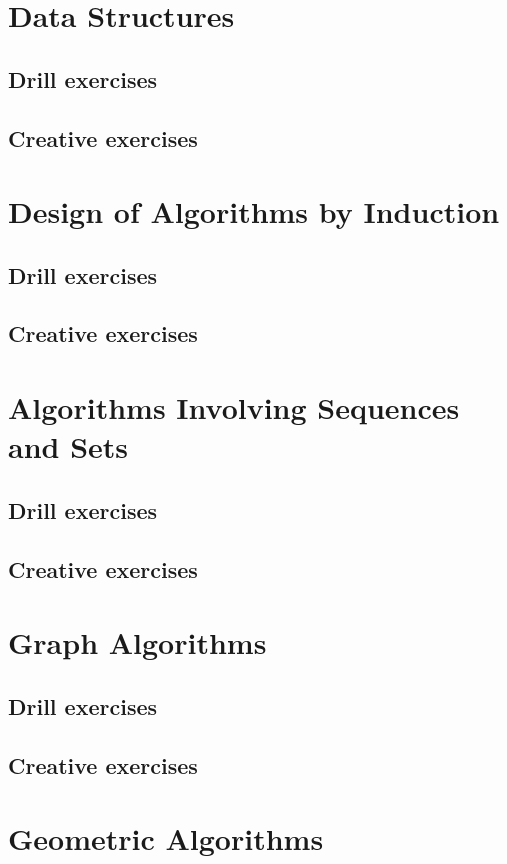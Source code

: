\documentclass[a4paper,11pt]{memoir}
\begin{document}
    \chapter{Data Structures}
    \section{Drill exercises}
    \section{Creative exercises}
    
    \chapter{Design of Algorithms by Induction}
    \section{Drill exercises}
    \section{Creative exercises}
    
    \chapter{Algorithms Involving Sequences and Sets}
    \section{Drill exercises}
    \section{Creative exercises}
    
    \chapter{Graph Algorithms}
    \section{Drill exercises}
    \section{Creative exercises}
    
    \chapter{Geometric Algorithms}
\end{document}
